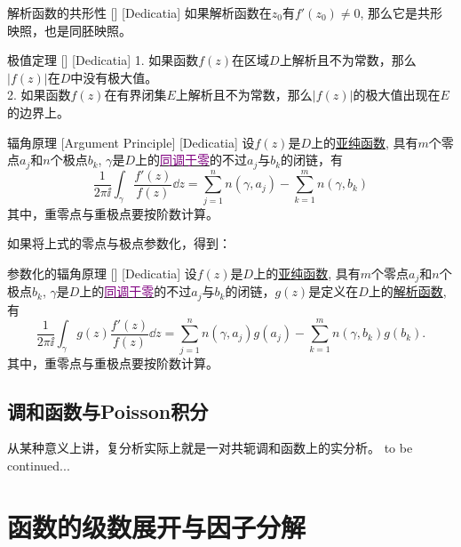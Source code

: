 \documentclass[UTF8]{ctexart}
\newcommand{\hyperrefc}[2]{\hyperref[#1]{\textcolor{purple}{#2}}}
\newcommand{\continued}{{\Large to be continued...}}
\newcommand{\AnalyticalFunction}{\hyperref[dfn:AnalyticalFunction]{解析函数}}
\newcommand{\MeromorphicFunction}{\hyperref[dfn:MeromorphicFunction]{亚纯函数}}
\begin{document}
\begin{crl}
    [UUID]
    {解析函数的共形性}
    []
    [Dedicatia]
    如果解析函数在$z_0$有$f'(z_0)\neq 0$, 那么它是共形映照，也是同胚映照。
\end{crl}
\begin{thm}
    [UUID]
    {极值定理}
    []
    [Dedicatia]
    1. 如果函数$f(z)$在区域$D$上解析且不为常数，那么$|f(z)|$在$D$中没有极大值。\\
    2. 如果函数$f(z)$在有界闭集$E$上解析且不为常数，那么$|f(z)|$的极大值出现在$E$的边界上。
\end{thm}
\begin{crl}
    [UUID]
    {辐角原理}
    [Argument Principle]
    [Dedicatia]
    设$f(z)$是$D$上的\MeromorphicFunction , 具有$m$个零点$a_j$和$n$个极点$b_k$, $\gamma$是$D$上的\hyperrefc{dfn:NullHomologous}{同调于零}的不过$a_j$与$b_k$的闭链，有
    \[\frac{1}{2\pi\ii}\int_\gamma\frac{f'(z)}{f(z)}\dd{z}=\sum_{j = 1}^{n} n(\gamma,a_j)-\sum_{k = 1}^{m} n(\gamma,b_k)  \]
    其中，重零点与重极点要按阶数计算。
\end{crl}
如果将上式的零点与极点参数化，得到：
\begin{crl}
    [UUID]
    {参数化的辐角原理}
    []
    [Dedicatia]
    设$f(z)$是$D$上的\MeromorphicFunction , 具有$m$个零点$a_j$和$n$个极点$b_k$, $\gamma$是$D$上的\hyperrefc{dfn:NullHomologous}{同调于零}的不过$a_j$与$b_k$的闭链，$g(z)$是定义在$D$上的\AnalyticalFunction , 有
    \[\frac{1}{2\pi\ii}\int_\gamma g(z)\frac{f'(z)}{f(z)}\dd{z}=\sum_{j = 1}^{n} n(\gamma,a_j)g(a_j)-\sum_{k = 1}^{m} n(\gamma,b_k)g(b_k).  \]
    其中，重零点与重极点要按阶数计算。
\end{crl}
\subsection{调和函数与Poisson积分}
从某种意义上讲，复分析实际上就是一对共轭调和函数上的实分析。
\continued

\section{函数的级数展开与因子分解}
\end{document}
